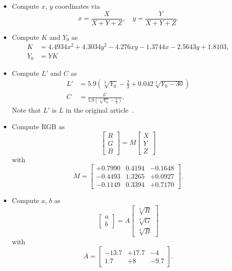 \documentclass{scrartcl}
\theoremstyle{named}
\begin{document}
\begin{itemize}
  \item Compute $x$, $y$ coordinates via
    \[
      x = \frac{X}{X + Y + Z},\quad y = \frac{Y}{X + Y + Z}.
    \]
  \item Compute $K$ and $Y_0$ as
    \[
      \begin{split}
        K &= 4.4934 x^2 + 4.3034 y^2 - 4.276 x y - 1.3744 x - 2.5643 y + 1.8103,\\
        Y_0 &= Y K
      \end{split}
    \]

  \item Compute $L'$ and $C$ as
    \begin{equation}\label{eq:lc}
      \begin{split}
        L' &= 5.9 \left(\sqrt[3]{Y_0} - \frac{2}{3} + 0.042 \sqrt[3]{Y_0 - 30}\right)\\
        C &= \frac{L'}{5.9 \left(\sqrt[3]{Y_0} - \frac{2}{3}\right)}.
      \end{split}
    \end{equation}
    Note that $L'$ is $L$ in the original article~\cite{macadam}.

  \item Compute RGB as
    \[
      \begin{bmatrix}
        R\\
        G\\
        B
      \end{bmatrix}
      =
      M
      \begin{bmatrix}
        X\\
        Y\\
        Z
      \end{bmatrix}
    \]
    with
    \[
      M=\begin{bmatrix}
        +0.7990 & 0.4194 & -0.1648\\
        -0.4493 & 1.3265 & +0.0927\\
        -0.1149 & 0.3394 & +0.7170
      \end{bmatrix}.
    \]

  \item Compute $a$, $b$ as
    \[
      \begin{bmatrix}
        a\\
        b
      \end{bmatrix}
      =
      A
      \begin{bmatrix}
        \sqrt[3]{R}\\
        \sqrt[3]{G}\\
        \sqrt[3]{B}
      \end{bmatrix}
    \]
    with
    \[
      A = \begin{bmatrix}
        -13.7 & +17.7 & -4\\
        1.7 & +8 & -9.7
      \end{bmatrix}.
    \]


\end{itemize}
\end{document}
